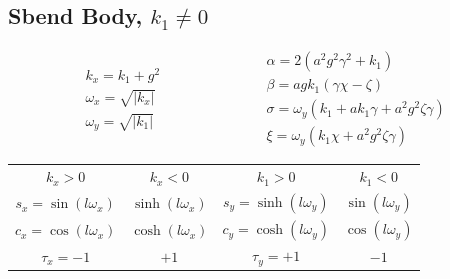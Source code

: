 \subsection{Sbend Body, $k_1 \neq 0$}

\begin{equation}
\begin{aligned}
  &  k_x = k_1 + g^2 \\
  & \omega_x = \sqrt{|k_x|} \\
  & \omega_y = \sqrt{|k_1|}
\end{aligned}
\qquad\qquad\qquad
\begin{aligned}
  & \alpha = 2(a^2 g^2 \gamma^2 + k_1) \\ \nonumber
  & \beta = a g k_1 (\gamma \chi - \zeta) \\ \nonumber
  & \sigma = \omega_y (k_1 + a k_1 \gamma + a^2g^2 \zeta \gamma)\\ \nonumber
  & \xi = \omega_y (k_1 \chi + a^2 g^2 \zeta \gamma) \nonumber
\end{aligned}
\end{equation}

\begin{center}
\begin{tabular}{cccc}
  $k_x > 0$                  & $k_x < 0$              & $k_1 > 0$                   & $k_1 < 0$  \\
  $s_x = \sin{(l \omega_x)}$ & $ \sinh{(l \omega_x)}$ & $s_y = \sinh{(l \omega_y)}$ & $ \sin{(l \omega_y)}$ \\
  $c_x = \cos{(l \omega_x)}$ & $ \cosh{(l \omega_x)}$ & $c_y = \cosh{(l \omega_y)}$ & $ \cos{(l \omega_y)}$ \\
  $\tau_x = -1$              & $+1$                   & $\tau_y = +1$               & $-1$
\end{tabular}
\end{center}

